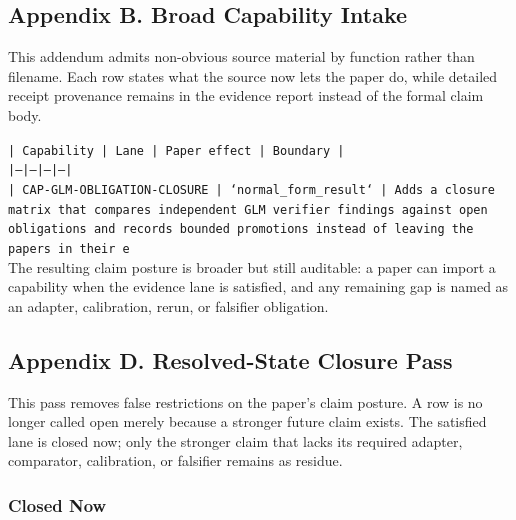 \documentclass[11pt]{article}
\begin{document}
\subsection*{Appendix B. Broad Capability Intake}

This addendum admits non-obvious source material by function rather than filename. Each row states what the source now lets the paper do, while detailed receipt provenance remains in the evidence report instead of the formal claim body.

\noindent\texttt{| Capability | Lane | Paper effect | Boundary |}\\
\noindent\texttt{|---|---|---|---|}\\
\noindent\texttt{| CAP-GLM-OBLIGATION-CLOSURE | `normal\_form\_result` | Adds a closure matrix that compares independent GLM verifier findings against open obligations and records bounded promotions instead of leaving the papers in their e}\\

The resulting claim posture is broader but still auditable: a paper can import a capability when the evidence lane is satisfied, and any remaining gap is named as an adapter, calibration, rerun, or falsifier obligation.

\subsection*{Appendix D. Resolved-State Closure Pass}

This pass removes false restrictions on the paper's claim posture. A row is no longer called open merely because a stronger future claim exists. The satisfied lane is closed now; only the stronger claim that lacks its required adapter, comparator, calibration, or falsifier remains as residue.

\subsubsection*{Closed Now}
\end{document}
